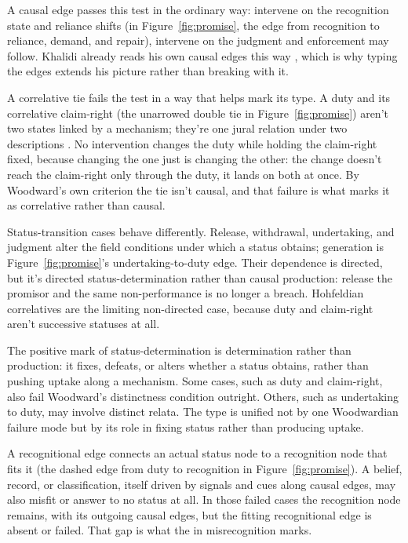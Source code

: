 \documentclass[12pt]{article}
\begin{document}
A causal edge passes this test in the ordinary way: intervene on the recognition state and reliance shifts (in Figure~\ref{fig:promise}, the edge from recognition to reliance, demand, and repair), intervene on the judgment and enforcement may follow. Khalidi already reads his own causal edges this way \citep{khalidi2018nodes}, which is why typing the edges extends his picture rather than breaking with it.

A correlative tie fails the test in a way that helps mark its type. A duty and its correlative claim-right (the unarrowed double tie in Figure~\ref{fig:promise}) aren't two states linked by a mechanism; they're one jural relation under two descriptions \citep{hohfeld1913SomeFundamental}. No intervention changes the duty while holding the claim-right fixed, because changing the one just is changing the other: the change doesn't reach the claim-right only through the duty, it lands on both at once. By Woodward's own criterion the tie isn't causal, and that failure is what marks it as correlative rather than causal.

Status-transition cases behave differently. Release, withdrawal, undertaking, and judgment alter the field conditions under which a status obtains; generation is Figure~\ref{fig:promise}'s undertaking-to-duty edge. Their dependence is directed, but it's directed status-determination rather than causal production: release the promisor and the same non-performance is no longer a breach. Hohfeldian correlatives are the limiting non-directed case, because duty and claim-right aren't successive statuses at all.

The positive mark of status-determination is determination rather than production: it fixes, defeats, or alters whether a status obtains, rather than pushing uptake along a mechanism. Some cases, such as duty and claim-right, also fail Woodward's distinctness condition outright. Others, such as undertaking to duty, may involve distinct relata. The type is unified not by one Woodwardian failure mode but by its role in fixing status rather than producing uptake.

A recognitional edge connects an actual status node to a recognition node that fits it (the dashed edge from duty to recognition in Figure~\ref{fig:promise}). A belief, record, or classification, itself driven by signals and cues along causal edges, may also misfit or answer to no status at all. In those failed cases the recognition node remains, with its outgoing causal edges, but the fitting recognitional edge is absent or failed. That gap is what the  in misrecognition marks.
\end{document}

